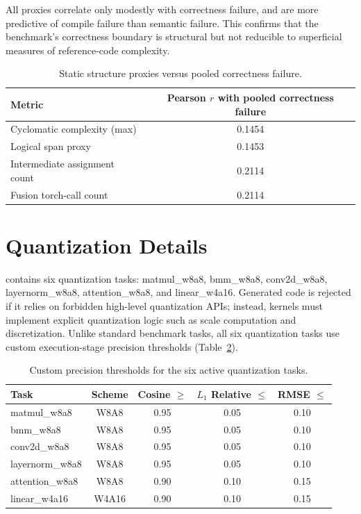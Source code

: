 All proxies correlate only modestly with correctness failure, and are more predictive of compile failure than semantic failure. This confirms that the benchmark’s correctness boundary is structural but not reducible to superficial measures of reference-code complexity.

\begin{table}[h]
\centering
\small
\caption{Static structure proxies versus pooled correctness failure.}
\begin{tabular}{lc}
\toprule
Metric & Pearson \(r\) with pooled correctness failure \\
\midrule
Cyclomatic complexity (max) & 0.1454 \\
Logical span proxy          & 0.1453 \\
Intermediate assignment count & 0.2114 \\
Fusion torch-call count       & 0.2114 \\
\bottomrule
\end{tabular}
\label{tab:appendix-structure-proxies}
\end{table}


\section{Quantization Details}
\label{app:quantization-details}

\oursys contains six quantization tasks: matmul\_w8a8, bmm\_w8a8, conv2d\_w8a8, layernorm\_w8a8, attention\_w8a8, and linear\_w4a16. Generated code is rejected if it relies on forbidden high-level quantization APIs; instead, kernels must implement explicit quantization logic such as scale computation and discretization. Unlike standard benchmark tasks, all six quantization tasks use custom execution-stage precision thresholds (Table~\ref{tab:appendix-quant-thresholds}).

\begin{table}[h]
\centering
\small
\caption{Custom precision thresholds for the six active quantization tasks.}
\begin{tabular}{lcccc}
\toprule
Task & Scheme & Cosine \(\ge\) & \(L_1\) Relative \(\le\) & RMSE \(\le\) \\
\midrule
matmul\_w8a8    & W8A8  & 0.95 & 0.05 & 0.10 \\
bmm\_w8a8       & W8A8  & 0.95 & 0.05 & 0.10 \\
conv2d\_w8a8    & W8A8  & 0.95 & 0.05 & 0.10 \\
layernorm\_w8a8 & W8A8  & 0.95 & 0.05 & 0.10 \\
attention\_w8a8 & W8A8  & 0.90 & 0.10 & 0.15 \\
linear\_w4a16   & W4A16 & 0.90 & 0.10 & 0.15 \\
\bottomrule
\end{tabular}
\label{tab:appendix-quant-thresholds}
\end{table}

